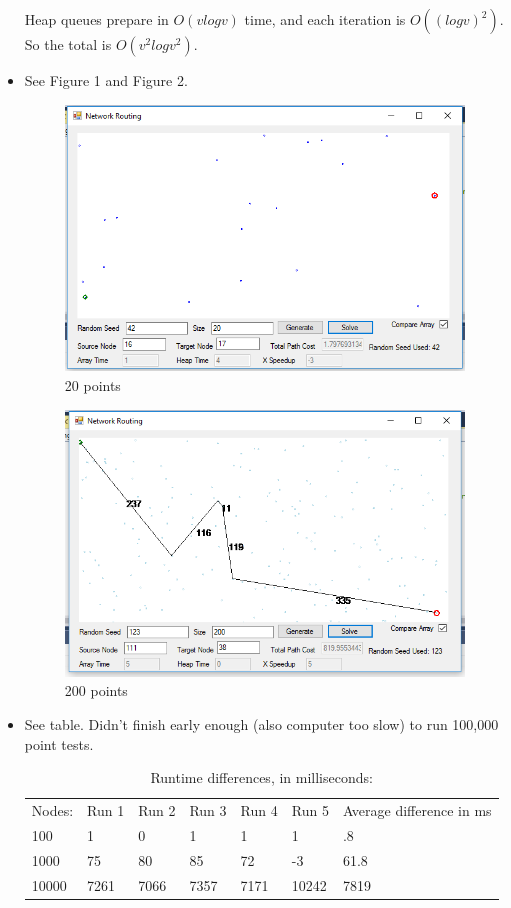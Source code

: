 \documentclass{article}
\begin{document}
\begin{itemize}
    Heap queues prepare in $O(v log v)$ time, and each iteration is $O((log v)^2)$.  So the total is $O(v^2 log v^2)$.
    \item See Figure 1 and Figure 2.
    \begin{figure}[p]
        \centering
        \includegraphics[resolution=72, width=\textwidth]{firstEx}
        \caption{20 points}
    \end{figure}
        \begin{figure}[p]
        \centering
        \includegraphics[resolution=72, width=\textwidth]{secEx}
        \caption{200 points}
    \end{figure}
    \item See table.  Didn't finish early enough (also computer too slow) to run 100,000 point tests.
    \begin{table}[]
\centering
\caption{Runtime differences, in milliseconds:}
\label{my-label}
\begin{tabular}{lllllll}
Nodes: & Run 1 & Run 2 & Run 3 & Run 4 & Run 5 & Average difference in ms \\
100    & 1     & 0     & 1     & 1     & 1     & .8                       \\
1000   & 75    & 80    & 85    & 72    & -3    & 61.8                     \\
10000  & 7261  & 7066  & 7357  & 7171  & 10242 & 7819                    
\end{tabular}
\end{table}
\end{itemize}
\end{document}

